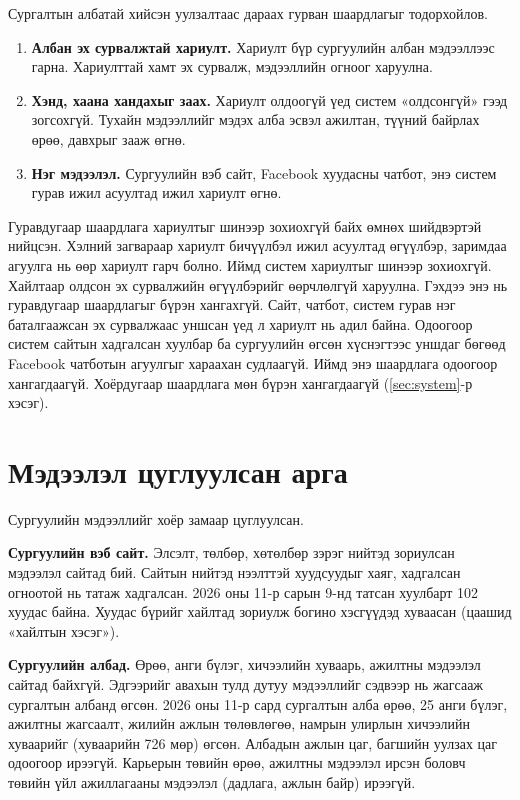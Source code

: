 Сургалтын албатай хийсэн уулзалтаас дараах гурван шаардлагыг тодорхойлов.
\begin{enumerate}
    \item \textbf{Албан эх сурвалжтай хариулт.} Хариулт бүр сургуулийн албан мэдээллээс гарна. Хариулттай хамт эх сурвалж, мэдээллийн огноог харуулна.
    \item \textbf{Хэнд, хаана хандахыг заах.} Хариулт олдоогүй үед систем «олдсонгүй» гээд зогсохгүй. Тухайн мэдээллийг мэдэх алба эсвэл ажилтан, түүний байрлах өрөө, давхрыг зааж өгнө.
    \item \textbf{Нэг мэдээлэл.} Сургуулийн вэб сайт, Facebook хуудасны чатбот, энэ систем гурав ижил асуултад ижил хариулт өгнө.
\end{enumerate}

Гуравдугаар шаардлага хариултыг шинээр зохиохгүй байх өмнөх шийдвэртэй нийцсэн. Хэлний загвараар хариулт бичүүлбэл ижил асуултад өгүүлбэр, заримдаа агуулга нь өөр хариулт гарч болно. Иймд систем хариултыг шинээр зохиохгүй. Хайлтаар олдсон эх сурвалжийн өгүүлбэрийг өөрчлөлгүй харуулна. Гэхдээ энэ нь гуравдугаар шаардлагыг бүрэн хангахгүй. Сайт, чатбот, систем гурав нэг баталгаажсан эх сурвалжаас уншсан үед л хариулт нь адил байна. Одоогоор систем сайтын хадгалсан хуулбар ба сургуулийн өгсөн хүснэгтээс уншдаг бөгөөд Facebook чатботын агуулгыг хараахан судлаагүй. Иймд энэ шаардлага одоогоор хангагдаагүй. Хоёрдугаар шаардлага мөн бүрэн хангагдаагүй (\ref{sec:system}-р хэсэг).

\section{Мэдээлэл цуглуулсан арга}
\label{sec:data-sources}

Сургуулийн мэдээллийг хоёр замаар цуглуулсан.

\textbf{Сургуулийн вэб сайт.} Элсэлт, төлбөр, хөтөлбөр зэрэг нийтэд зориулсан мэдээлэл сайтад бий. Сайтын нийтэд нээлттэй хуудсуудыг хаяг, хадгалсан огноотой нь татаж хадгалсан. 2026 оны 11-р сарын 9-нд татсан хуулбарт 102 хуудас байна. Хуудас бүрийг хайлтад зориулж богино хэсгүүдэд хуваасан (цаашид «хайлтын хэсэг»).

\textbf{Сургуулийн албад.} Өрөө, анги бүлэг, хичээлийн хуваарь, ажилтны мэдээлэл сайтад байхгүй. Эдгээрийг авахын тулд дутуу мэдээллийг сэдвээр нь жагсааж сургалтын албанд өгсөн. 2026 оны 11-р сард сургалтын алба өрөө, 25 анги бүлэг, ажилтны жагсаалт, жилийн ажлын төлөвлөгөө, намрын улирлын хичээлийн хуваарийг (хуваарийн 726 мөр) өгсөн. Албадын ажлын цаг, багшийн уулзах цаг одоогоор ирээгүй. Карьерын төвийн өрөө, ажилтны мэдээлэл ирсэн боловч төвийн үйл ажиллагааны мэдээлэл (дадлага, ажлын байр) ирээгүй.

